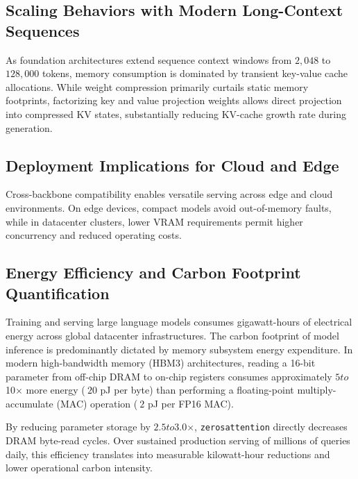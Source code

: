 \subsection{Scaling Behaviors with Modern Long-Context Sequences}
As foundation architectures extend sequence context windows from $2{,}048$ to $128{,}000$ tokens, memory consumption is dominated by transient key-value cache allocations. While weight compression primarily curtails static memory footprints, factorizing key and value projection weights allows direct projection into compressed KV states, substantially reducing KV-cache growth rate during generation.

\subsection{Deployment Implications for Cloud and Edge}
Cross-backbone compatibility enables versatile serving across edge and cloud environments. On edge devices, compact models avoid out-of-memory faults, while in datacenter clusters, lower VRAM requirements permit higher concurrency and reduced operating costs.

\subsection{Energy Efficiency and Carbon Footprint Quantification}
Training and serving large language models consumes gigawatt-hours of electrical energy across global datacenter infrastructures. The carbon footprint of model inference is predominantly dictated by memory subsystem energy expenditure. In modern high-bandwidth memory (HBM3) architectures, reading a 16-bit parameter from off-chip DRAM to on-chip registers consumes approximately $5$\times$ to $10$\times$ more energy ($~20$ pJ per byte) than performing a floating-point multiply-accumulate (MAC) operation ($~2$ pJ per FP16 MAC).

By reducing parameter storage by $2.5$\times$ to $3.0$\times$, \texttt{zerosattention} directly decreases DRAM byte-read cycles. Over sustained production serving of millions of queries daily, this efficiency translates into measurable kilowatt-hour reductions and lower operational carbon intensity.
